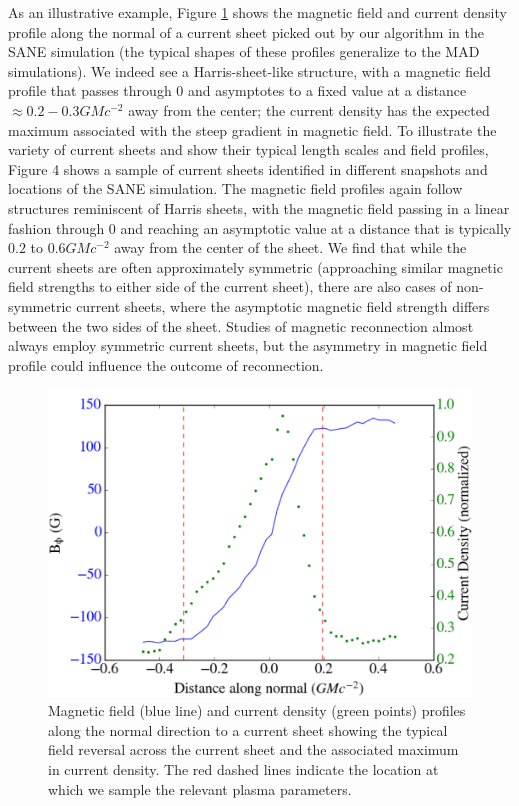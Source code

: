 As an illustrative example, Figure \ref{fieldprof} shows the magnetic field
and current density profile along the normal of a current sheet
picked out by our algorithm in the SANE simulation (the
typical shapes of these profiles generalize to the MAD
simulations). We indeed see a Harris-sheet-like structure, with
a magnetic field profile that passes through 0 and asymptotes to
a fixed value at a distance $\approx 0.2-0.3 GMc^{-2}$ away from the
center; the current density has the expected maximum
associated with the steep gradient in magnetic field. To
illustrate the variety of current sheets and show their typical
length scales and field profiles, Figure 4 shows a sample of
current sheets identified in different snapshots and locations of
the SANE simulation. The magnetic field profiles again follow
structures reminiscent of Harris sheets, with the magnetic field
passing in a linear fashion through 0 and reaching an
asymptotic value at a distance that is typically $0.2$ to
$0.6 GMc^{-2}$ away from the center of the sheet. We find that
while the current sheets are often approximately symmetric
(approaching similar magnetic field strengths to either side of
the current sheet), there are also cases of non-symmetric current
sheets, where the asymptotic magnetic field strength differs
between the two sides of the sheet. Studies of magnetic
reconnection almost always employ symmetric current sheets,
but the asymmetry in magnetic field profile could influence the
outcome of reconnection.


\begin{figure}[!h]
	\centering
	\includegraphics[width =\textwidth]{paper2_fig3.jpg}
	\caption{Magnetic field (blue line) and current density (green points) profiles
		along the normal direction to a current sheet showing the typical field reversal
		across the current sheet and the associated maximum in current density. The
		red dashed lines indicate the location at which we sample the relevant plasma
		parameters.}
	\label{fieldprof}
\end{figure}


